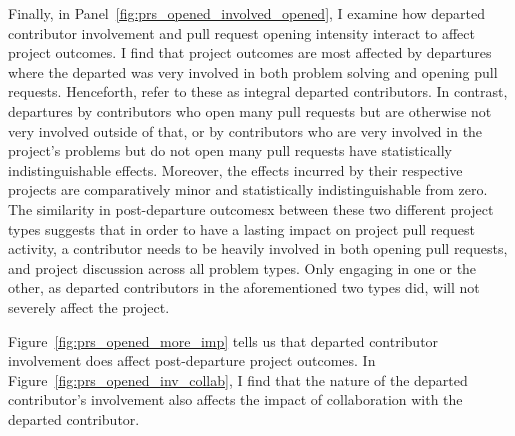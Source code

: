 \documentclass[12pt,notitlepage]{article}
\begin{document}
Finally, in Panel~\ref{fig:prs_opened_involved_opened}, I examine how departed contributor involvement and pull request opening intensity interact to affect project outcomes. I find that project outcomes are most affected by departures where the departed was very involved in both problem solving and opening pull requests. Henceforth, refer to these as integral departed contributors. In contrast, departures by contributors who open many pull requests but are otherwise not very involved outside of that, or by contributors who are very involved in the project's problems but do not open many pull requests have statistically indistinguishable effects. Moreover, the effects incurred by their respective projects are comparatively minor and statistically indistinguishable from zero. The similarity in post-departure outcomesx between these two different project types suggests that in order to have a lasting impact on project pull request activity, a contributor needs to be heavily involved in both opening pull requests, and project discussion across all problem types. Only engaging in one or the other, as departed contributors in the aforementioned two types did, will not severely affect the project. 



Figure~\ref{fig:prs_opened_more_imp} tells us that departed contributor involvement does affect post-departure project outcomes. In Figure~\ref{fig:prs_opened_inv_collab}, I find that the nature of the departed contributor's involvement also affects the impact of collaboration with the departed contributor. 
\end{document}
